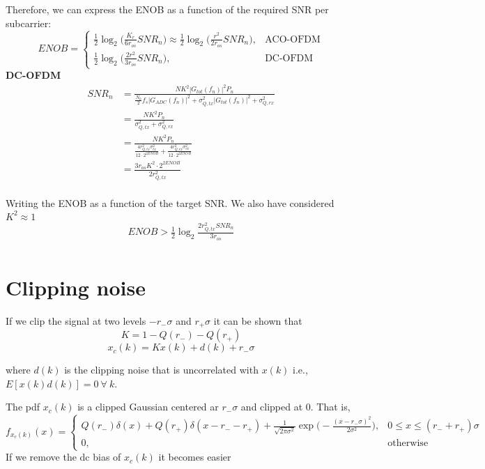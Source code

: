 \documentclass[a4paper]{article}
\begin{document}
Therefore, we can express the ENOB as a function of the required SNR per subcarrier:
\begin{equation}
ENOB = \begin{cases}
\frac{1}{2}\log_2\bigg(\frac{K_r}{6r_{os}}SNR_n\bigg) \approx \frac{1}{2}\log_2\bigg(\frac{r^2}{2r_{os}}SNR_n\bigg) , & \text{ACO-OFDM} \\
\frac{1}{2}\log_2\bigg(\frac{2r^2}{3r_{os}}SNR_n\bigg), & \text{DC-OFDM}
\end{cases}
\end{equation}
\textbf{DC-OFDM}
\begin{align} \nonumber
SNR_n & =  \frac{NK^2|G_{tot}(f_n)|^2P_n}{\frac{N_0}{2}f_s|G_{ADC}(f_n)|^2 + \sigma_{Q,tx}^2|G_{tot}(f_n)|^2 + \sigma_{Q,rx}^2} \\
& = \frac{NK^2P_n}{ \sigma_{Q,tx}^2 + \sigma_{Q,rx}^2} \\
&= \frac{NK^2P_n}{ \frac{4r_{Q,tx}^2\sigma_{tx}^2}{12\cdot 2^{2ENOB}} + \frac{4r_{Q,rx}^2\sigma_{rx}^2}{12\cdot 2^{2ENOB}}} \\
&= \frac{3r_{os}K^2 \cdot 2^{2ENOB}}{2r_{Q,tx}^2} \\
\end{align}

Writing the ENOB as a function of the target SNR. We also have considered $K^2 \approx 1$
\begin{align} \nonumber
ENOB > \frac{1}{2}\log_2\frac{2r_{Q,tx}^2SNR_n}{3r_{os}}  \\
\end{align}




\section{Clipping noise}
If we clip the signal at two levels $-r_-\sigma$ and $r_+\sigma$ it can be shown that 
\begin{equation}
K = 1 -Q(r_-) - Q(r_+)
\end{equation}
\begin{equation} \label{Bussgangs}
x_c(k) = Kx(k) + d(k) + r_-\sigma
\end{equation}

where  $d(k)$ is the clipping noise that is uncorrelated with $x(k)$ i.e., $E[x(k)d(k)] = 0 ~\forall~k$.

The pdf $x_c(k)$ is a clipped Gaussian centered ar $r_-\sigma$ and clipped at 0. That is,
\begin{equation}
f_{x_c(k)}(x) = \begin{cases}
Q(r_-)\delta(x) + Q(r_+)\delta(x - r_- - r_+) + \frac{1}{\sqrt{2\pi\sigma^2}}\exp\Big(-\frac{(x-r_-\sigma)^2}{2\sigma^2}\Big), & 0 \leq x   \leq (r_- + r_+)\sigma \\
0, & \mathrm{otherwise}
\end{cases}
\end{equation}
If we remove the dc bias of $x_c(k)$ it becomes easier 
\end{document}
